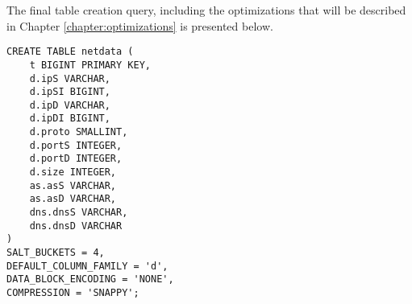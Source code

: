 The final table creation query, including the optimizations that will be described in Chapter \ref{chapter:optimizations} is presented below.

\begin{lstlisting}[language=PhoenixSQL]
CREATE TABLE netdata (
    t BIGINT PRIMARY KEY,
    d.ipS VARCHAR,
    d.ipSI BIGINT,
    d.ipD VARCHAR,
    d.ipDI BIGINT,
    d.proto SMALLINT,
    d.portS INTEGER,
    d.portD INTEGER,
    d.size INTEGER,
    as.asS VARCHAR,
    as.asD VARCHAR,
    dns.dnsS VARCHAR,
    dns.dnsD VARCHAR
) 
SALT_BUCKETS = 4,
DEFAULT_COLUMN_FAMILY = 'd',
DATA_BLOCK_ENCODING = 'NONE',
COMPRESSION = 'SNAPPY';
\end{lstlisting}


\cleardoublepage
